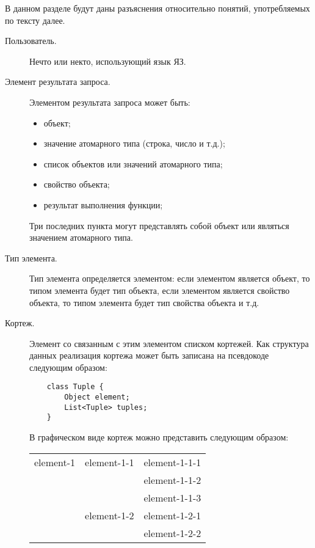 В данном разделе будут даны разъяснения относительно
понятий, употребляемых по тексту далее.

\begin{description}
    \item [Пользователь.] Нечто или некто, использующий язык ЯЗ.
    \item [Элемент результата запроса.] Элементом результата запроса
может быть: 
	\begin{itemize}\addtolength{\itemsep}{-0.3\baselineskip}
	    \item объект; 
	    \item значение атомарного типа (строка, число и т.д.);
	    \item список объектов или значений атомарного типа;
	    \item свойство объекта;
	    \item результат выполнения функции;
	\end{itemize}
	Три последних пункта могут представлять собой объект или являться значением атомарного типа.
    \item [Тип элемента.] Тип элемента определяется элементом:
если элементом является объект, то типом элемента будет тип объекта, если
элементом является свойство объекта, то типом элемента будет тип свойства объекта и т.д. 
    \item [Кортеж.] Элемент со связанным с этим элементом списком кортежей. Как структура данных
реализация кортежа может быть записана на псевдокоде следующим образом:
\begin{verbatim}
    class Tuple {
        Object element;
        List<Tuple> tuples;
    }
\end{verbatim}
В графическом виде кортеж можно представить следующим образом:
\begin{center}
    \begin{tabular}{|l|l|l|}
	\hline
	element-1 & element-1-1 & element-1-1-1\\
	\cline{3-3}
				    & & element-1-1-2\\
	\cline{3-3}
				    & & element-1-1-3\\
	\cline{2-3}
		    & element-1-2 & element-1-2-1\\
	\cline{3-3}
				    & & element-1-2-2\\

\end{tabular}
\end{center}
\end{description}
